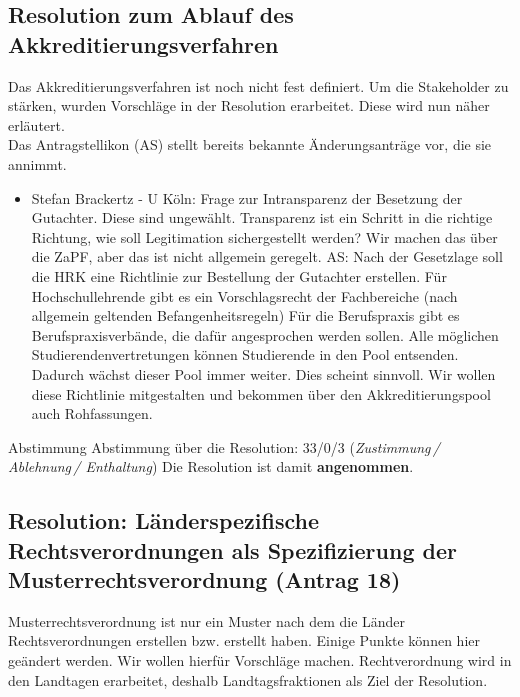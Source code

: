   \subsection*{Resolution zum Ablauf des Akkreditierungsverfahren}
    Das Akkreditierungsverfahren ist noch nicht fest definiert. Um die Stakeholder zu stärken, wurden Vorschläge in der Resolution erarbeitet. Diese wird nun näher erläutert. \\
    Das Antragstellikon (AS) stellt bereits bekannte Änderungsanträge vor, die sie annimmt.

    \begin{itemize}
      \item Stefan Brackertz - U Köln: Frage zur Intransparenz der Besetzung der Gutachter. Diese sind ungewählt. Transparenz ist ein Schritt in die richtige Richtung, wie soll Legitimation sichergestellt werden? Wir machen das über die ZaPF, aber das ist nicht allgemein geregelt.
      AS: Nach der Gesetzlage soll die HRK eine Richtlinie zur Bestellung der Gutachter erstellen. Für Hochschullehrende gibt es ein Vorschlagsrecht der Fachbereiche (nach allgemein geltenden Befangenheitsregeln)
      Für die Berufspraxis gibt es Berufspraxisverbände, die dafür angesprochen werden sollen.
      Alle möglichen Studierendenvertretungen können Studierende in den Pool entsenden. Dadurch wächst dieser Pool immer weiter. Dies scheint sinnvoll.
      Wir wollen diese Richtlinie mitgestalten und bekommen über den Akkreditierungspool auch Rohfassungen.
    \end{itemize}

    \begin{success}{Abstimmung}
      Abstimmung über die Resolution: 33/0/3 (\textit{Zustimmung\,/ Ablehnung\,/ Enthaltung})
      Die Resolution ist damit \textbf{angenommen}.
    \end{success}

  \subsection*{Resolution: Länderspezifische Rechtsverordnungen als Spezifizierung der Musterrechtsverordnung (Antrag 18)}
    Musterrechtsverordnung ist nur ein Muster nach dem die Länder Rechtsverordnungen erstellen bzw. erstellt haben. Einige Punkte können hier geändert werden. Wir wollen hierfür Vorschläge machen.
    Rechtverordnung wird in den Landtagen erarbeitet, deshalb Landtagsfraktionen als Ziel der Resolution. \\

